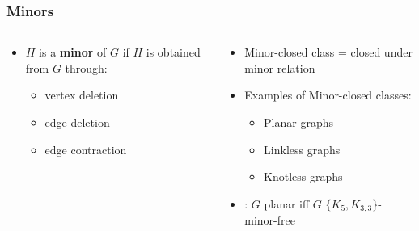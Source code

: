 \documentclass[english]{beamer}
\begin{document}
\begin{frame}
  \frametitle{Minors}
  \begin{columns}
    \begin{column}{0.5\textwidth}
      \begin{itemize}
        \item $H$ is a \textbf{minor} of $G$ if $H$ is obtained from $G$ through:
              \begin{itemize}
                \item vertex deletion
                \item edge deletion
                \item edge contraction
              \end{itemize}
              \begin{figure}
                \centering
                
              \end{figure}
      \end{itemize}
    \end{column}
    \pause
    \begin{column}{0.5\textwidth}
      \begin{itemize}
        \item Minor-closed class = closed under minor relation
        \item Examples of Minor-closed classes:
              \begin{itemize}
                \item Planar graphs
                \item Linkless graphs
                \item Knotless graphs
              \end{itemize}
        \item \textcite{kuratowskiProblemeCourbesGauches1930,wagnerUeberEigenschaftEbenen1937}: $G$ planar iff $G$ $\{K_5, K_{3,3}\}$-minor-free
      \end{itemize}
    \end{column}
  \end{columns}
\end{frame}
\end{document}
